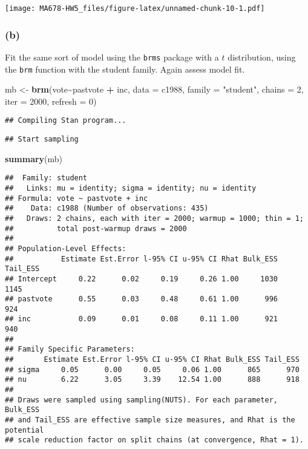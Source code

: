 \documentclass[
]{article}
\newenvironment{Shaded}{\begin{snugshade}}{\end{snugshade}}
\newcommand{\AttributeTok}[1]{\textcolor[rgb]{0.13,0.29,0.53}{#1}}
\newcommand{\DecValTok}[1]{\textcolor[rgb]{0.00,0.00,0.81}{#1}}
\newcommand{\FunctionTok}[1]{\textcolor[rgb]{0.13,0.29,0.53}{\textbf{#1}}}
\newcommand{\NormalTok}[1]{#1}
\newcommand{\OtherTok}[1]{\textcolor[rgb]{0.56,0.35,0.01}{#1}}
\newcommand{\SpecialCharTok}[1]{\textcolor[rgb]{0.81,0.36,0.00}{\textbf{#1}}}
\newcommand{\StringTok}[1]{\textcolor[rgb]{0.31,0.60,0.02}{#1}}
\begin{document}
\texttt{[image: MA678-HW5\_files/figure-latex/unnamed-chunk-10-1.pdf]}

\hypertarget{b-2}{%
\subsubsection{(b)}\label{b-2}}

Fit the same sort of model using the \texttt{brms} package with a \(t\)
distribution, using the \texttt{brm} function with the student family.
Again assess model fit.

\begin{Shaded}
\begin{Highlighting}[]
\NormalTok{mb }\OtherTok{\textless{}{-}} \FunctionTok{brm}\NormalTok{(vote}\SpecialCharTok{\textasciitilde{}}\NormalTok{pastvote }\SpecialCharTok{+}\NormalTok{ inc, }\AttributeTok{data =}\NormalTok{ c1988, }\AttributeTok{family =} \StringTok{"student"}\NormalTok{, }\AttributeTok{chains =} \DecValTok{2}\NormalTok{, }\AttributeTok{iter =} \DecValTok{2000}\NormalTok{, }\AttributeTok{refresh =} \DecValTok{0}\NormalTok{)}
\end{Highlighting}
\end{Shaded}

\begin{verbatim}
## Compiling Stan program...
\end{verbatim}

\begin{verbatim}
## Start sampling
\end{verbatim}

\begin{Shaded}
\begin{Highlighting}[]
\FunctionTok{summary}\NormalTok{(mb)}
\end{Highlighting}
\end{Shaded}

\begin{verbatim}
##  Family: student 
##   Links: mu = identity; sigma = identity; nu = identity 
## Formula: vote ~ pastvote + inc 
##    Data: c1988 (Number of observations: 435) 
##   Draws: 2 chains, each with iter = 2000; warmup = 1000; thin = 1;
##          total post-warmup draws = 2000
## 
## Population-Level Effects: 
##           Estimate Est.Error l-95% CI u-95% CI Rhat Bulk_ESS Tail_ESS
## Intercept     0.22      0.02     0.19     0.26 1.00     1030     1145
## pastvote      0.55      0.03     0.48     0.61 1.00      996      924
## inc           0.09      0.01     0.08     0.11 1.00      921      940
## 
## Family Specific Parameters: 
##       Estimate Est.Error l-95% CI u-95% CI Rhat Bulk_ESS Tail_ESS
## sigma     0.05      0.00     0.05     0.06 1.00      865      970
## nu        6.22      3.05     3.39    12.54 1.00      888      918
## 
## Draws were sampled using sampling(NUTS). For each parameter, Bulk_ESS
## and Tail_ESS are effective sample size measures, and Rhat is the potential
## scale reduction factor on split chains (at convergence, Rhat = 1).
\end{verbatim}
\end{document}

